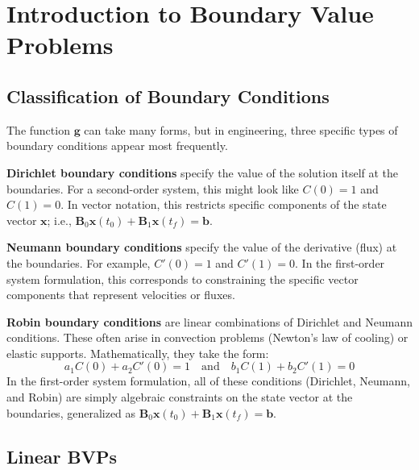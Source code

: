 \section{Introduction to Boundary Value Problems}

\subsection{Classification of Boundary Conditions}

The function $\mathbf{g}$ can take many forms, but in engineering, three specific types of boundary conditions appear most frequently.

\textbf{Dirichlet boundary conditions} specify the value of the solution itself at the boundaries. For a second-order system, this might look like $C(0) = 1$ and $C(1) = 0$. In vector notation, this restricts specific components of the state vector $\mathbf{x}$; i.e., $\mathbf{B}_0 \mathbf{x}(t_0) + \mathbf{B}_1 \mathbf{x}(t_f) = \mathbf{b}$.

\textbf{Neumann boundary conditions} specify the value of the derivative (flux) at the boundaries. For example, $C'(0) = 1$ and $C'(1) = 0$. In the first-order system formulation, this corresponds to constraining the specific vector components that represent velocities or fluxes.

\textbf{Robin boundary conditions} are linear combinations of Dirichlet and Neumann conditions. These often arise in convection problems (Newton's law of cooling) or elastic supports. Mathematically, they take the form:
\begin{equation}
    a_1 C(0) + a_2 C'(0) = 1 \quad \text{and} \quad b_1 C(1) + b_2 C'(1) = 0
\end{equation}
In the first-order system formulation, all of these conditions (Dirichlet, Neumann, and Robin) are simply algebraic constraints on the state vector at the boundaries, generalized as $\mathbf{B}_0 \mathbf{x}(t_0) + \mathbf{B}_1 \mathbf{x}(t_f) = \mathbf{b}$.

\subsection{Linear BVPs}

